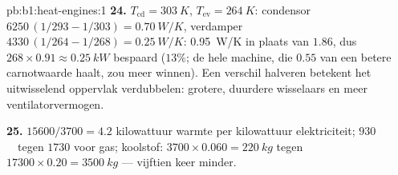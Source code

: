 \begin{solution}{pb:b1:heat-engines:1}
\textbf{24.} $T_{\mathrm{cd}} = \qty{303}{K}$, $T_{\mathrm{ev}} = \qty{264}{K}$:
condensor $6250\,(1/293 - 1/303) = \qty{0.70}{W/K}$, verdamper
$4330\,(1/264 - 1/268) = \qty{0.25}{W/K}$: \qty{0.95}{W/K} in plaats van
$1.86$, dus $268 \times 0.91 \approx \qty{0.25}{kW}$ bespaard ($13\%$; de
hele machine, die $0.55$ van een betere carnotwaarde haalt, zou meer
winnen). Een verschil halveren betekent het uitwisselend oppervlak verdubbelen: grotere,
duurdere wisselaars en meer ventilatorvermogen.

\textbf{25.} $15600/3700 = 4.2$ kilowattuur warmte per kilowattuur
elektriciteit; $930$~\texteuro\ tegen $1730$ voor gas; koolstof: $3700
\times 0.060 = \qty{220}{kg}$ tegen $17300 \times 0.20 = \qty{3500}{kg}$ ---
vijftien keer minder.
\end{solution}
